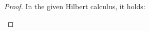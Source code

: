         \begin{proof}
            In the given Hilbert calculus, it holds:
            \footnotesize
            \begin{sequentdeduction}
            \end{sequentdeduction}
        \end{proof}


